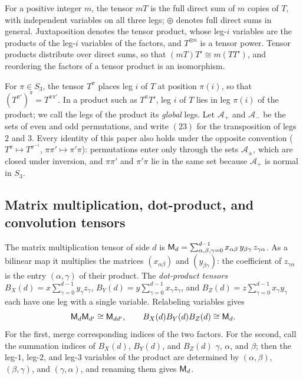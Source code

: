 For a positive integer \(m\), the tensor \(mT\) is the full direct sum of
\(m\) copies of \(T\), with independent variables on all three legs;
\(\oplus\) denotes full direct sums in general. Juxtaposition denotes the
tensor product, whose leg-\(i\) variables are the products of the leg-\(i\)
variables of the factors, and \(T^{\otimes n}\) is a tensor power. Tensor
products distribute over direct sums, so that \((mT)T'\cong m(TT')\), and
reordering the factors of a tensor product is an isomorphism.

For \(\pi\in S_3\), the tensor \(T^\pi\) places leg \(i\) of \(T\) at
position \(\pi(i)\), so that \((T^{\pi'})^{\pi}=T^{\pi\pi'}\). In a product
such as \(T^\pi T'\), leg \(i\) of \(T\) lies
in leg \(\pi(i)\) of the product; we call the legs of the product its
\emph{global} legs. Let \(\mathcal A_+\) and \(\mathcal A_-\) be the sets of
even and odd permutations, and write \((23)\) for the transposition of legs
\(2\) and \(3\). Every identity of this paper also holds under the opposite
convention (\(T^\pi\mapsto T^{\pi^{-1}}\), \(\pi\pi'\mapsto\pi'\pi\)):
permutations enter only through the sets \(\mathcal A_\pm\), which are
closed under inversion, and \(\pi\pi'\) and \(\pi'\pi\) lie in the same set
because \(\mathcal A_+\) is normal in \(S_3\).

\subsection{Matrix multiplication, dot-product, and convolution tensors}
\label{subsec:prelim-tensors}

The matrix multiplication tensor of side \(d\) is
\(\mathsf M_d=\sum_{\alpha,\beta,\gamma=0}^{d-1}
x_{\alpha\beta}\,y_{\beta\gamma}\,z_{\gamma\alpha}\). As a bilinear map it
multiplies the matrices \((x_{\alpha\beta})\) and
\((y_{\beta\gamma})\): the coefficient of \(z_{\gamma\alpha}\) is the entry
\((\alpha,\gamma)\) of their product. The \emph{dot-product tensors}
\(B_X(d)=x\sum_{\gamma=0}^{d-1}y_\gamma z_\gamma\),
\(B_Y(d)=y\sum_{\gamma=0}^{d-1}x_\gamma z_\gamma\), and
\(B_Z(d)=z\sum_{\gamma=0}^{d-1}x_\gamma y_\gamma\) each have one leg with a
single variable. Relabeling variables gives
\begin{equation}\label{eq:matrix-products}
 \mathsf M_d\mathsf M_{d'}\cong\mathsf M_{dd'},\qquad
 B_X(d)B_Y(d)B_Z(d)\cong\mathsf M_d .
\end{equation}
For the first, merge corresponding indices of the two factors. For the
second, call the summation indices of \(B_X(d)\), \(B_Y(d)\), and
\(B_Z(d)\) \(\gamma\), \(\alpha\), and \(\beta\); then the leg-\(1\),
leg-\(2\), and leg-\(3\) variables of the product are determined by
\((\alpha,\beta)\), \((\beta,\gamma)\), and \((\gamma,\alpha)\), and
renaming them gives \(\mathsf M_d\).

